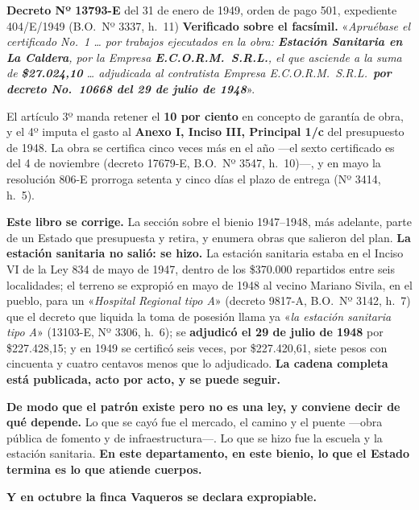\begin{ficha}{\textbf{Decreto Nº 13793-E} del 31 de enero de 1949, orden de pago 501, expediente 404/E/1949 (B.O.\ Nº 3337, h.\ 11)}
\textbf{Verificado sobre el facsímil.} «\textit{Apruébase el certificado No.\ 1 \ldots{} por
trabajos ejecutados en la obra: \textbf{Estación Sanitaria en La Caldera}, por la Empresa
\textbf{E.C.O.R.M.\ S.R.L.}, el que asciende a la suma de \textbf{\$27.024,10} \ldots{}
adjudicada al contratista Empresa E.C.O.R.M.\ S.R.L.\ \textbf{por decreto No.\ 10668 del 29 de
julio de 1948}}».

El artículo 3º manda retener el \textbf{10 por ciento} en concepto de garantía de obra, y el
4º imputa el gasto al \textbf{Anexo I, Inciso III, Principal 1/c} del presupuesto de 1948.
La obra se certifica cinco veces más en el año ---el sexto certificado es del 4 de noviembre
(decreto 17679-E, B.O.\ Nº 3547, h.\ 10)---, y en mayo la resolución 806-E prorroga setenta y cinco
días el plazo de entrega (Nº 3414, h.\ 5).
\end{ficha}

\begin{cautela}
\textbf{Este libro se corrige.} La sección sobre el bienio 1947--1948, más adelante, parte de un
Estado que presupuesta y retira, y enumera obras que salieron del plan.
\textbf{La estación sanitaria no salió: se hizo.} La estación sanitaria estaba en el Inciso VI de la Ley
834 de mayo de 1947, dentro de los \$370.000 repartidos entre seis localidades; el terreno se
expropió en mayo de 1948 al vecino Mariano Sivila, en el pueblo, para un «\textit{Hospital Regional
tipo A}» (decreto 9817-A, B.O.\ Nº 3142, h.\ 7) que el decreto que liquida la toma de posesión llama ya
«\textit{la estación sanitaria tipo A}» (13103-E, Nº 3306, h.\ 6); se \textbf{adjudicó el 29 de julio de
1948} por \$227.428,15; y en 1949 se certificó seis veces, por \$227.420,61, siete pesos con cincuenta y
cuatro centavos menos que lo adjudicado. \textbf{La cadena completa está publicada, acto por acto, y se
puede seguir.}

\textbf{De modo que el patrón existe pero no es una ley, y conviene decir de qué depende.} Lo
que se cayó fue el mercado, el camino y el puente ---obra pública de fomento y de
infraestructura---. Lo que se hizo fue la escuela y la estación sanitaria. \textbf{En este
departamento, en este bienio, lo que el Estado termina es lo que atiende cuerpos.}
\end{cautela}

\textbf{Y en octubre la finca Vaqueros se declara expropiable.}


